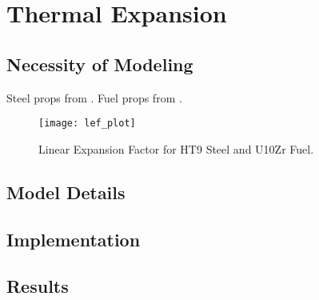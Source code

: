 \chapter{Thermal Expansion}
\label{ch:thermalExpansion}

\section{Necessity of Modeling}
  Steel props from \cite{ht9Prop}.
  Fuel props from \cite{thexpU10Zr}.

  \begin{figure}
    \centering
    \texttt{[image: lef\_plot]}
    \caption{Linear Expansion Factor for HT9 Steel and U10Zr Fuel.}
    \label{fig:lef_plot}
  \end{figure}

\section{Model Details}

\section{Implementation}

\section{Results}
